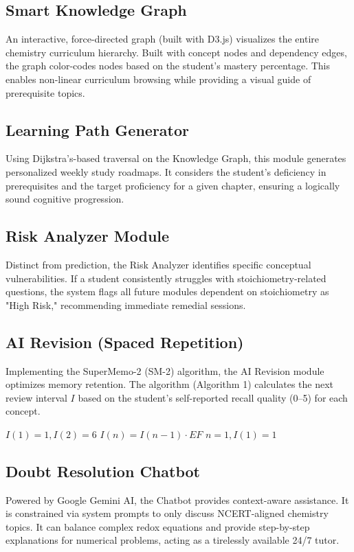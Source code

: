 \documentclass[10pt, conference]{IEEEtran}
\begin{document}
\subsection{Smart Knowledge Graph}
An interactive, force-directed graph (built with D3.js) visualizes the entire chemistry curriculum hierarchy. Built with concept nodes and dependency edges, the graph color-codes nodes based on the student's mastery percentage. This enables non-linear curriculum browsing while providing a visual guide of prerequisite topics.

\subsection{Learning Path Generator}
Using Dijkstra's-based traversal on the Knowledge Graph, this module generates personalized weekly study roadmaps. It considers the student's deficiency in prerequisites and the target proficiency for a given chapter, ensuring a logically sound cognitive progression.

\subsection{Risk Analyzer Module}
Distinct from prediction, the Risk Analyzer identifies specific conceptual vulnerabilities. If a student consistently struggles with stoichiometry-related questions, the system flags all future modules dependent on stoichiometry as "High Risk," recommending immediate remedial sessions.

\subsection{AI Revision (Spaced Repetition)}
Implementing the SuperMemo-2 (SM-2) algorithm, the AI Revision module optimizes memory retention. The algorithm (Algorithm 1) calculates the next review interval $I$ based on the student's self-reported recall quality (0--5) for each concept.
\begin{algorithm}
\caption{SM-2 Revision Schedule}
\begin{algorithmic}
\STATE $I(1) = 1, I(2) = 6$
\STATE $I(n) = I(n-1) \cdot EF$
\ENDFOR
{}
\STATE $n = 1, I(1) = 1$
\ENDIF
\end{algorithmic}
\end{algorithm}

\subsection{Doubt Resolution Chatbot}
Powered by Google Gemini AI, the Chatbot provides context-aware assistance. It is constrained via system prompts to only discuss NCERT-aligned chemistry topics. It can balance complex redox equations and provide step-by-step explanations for numerical problems, acting as a tirelessly available 24/7 tutor.
\end{document}
